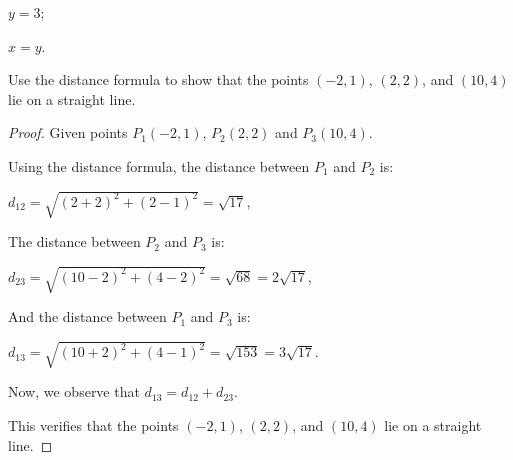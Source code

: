 \begin{questions}
\begin{tasks}
    \task $y=3$;
    \begin{solution}

    \end{solution}

    \task $x=y$.
    \begin{solution}

    \end{solution}
  \end{tasks}

  \item Use the distance formula to show that the points $(-2, 1)$, $(2,2)$, and $(10, 4)$ lie on a straight line.
  \begin{proof}
    Given points $P_1(-2, 1)$, $P_2(2,2)$ and $P_3(10,4)$.

    Using the distance formula, the distance between $P_1$ and $P_2$ is:

    $d_{12} = \sqrt{(2+2)^2+(2-1)^2}=\sqrt{17}$,

    The distance between $P_2$ and $P_3$ is:

    $d_{23} = \sqrt{(10-2)^2+(4-2)^2}=\sqrt{68}=2\sqrt{17}$,

    And the distance between $P_1$ and $P_3$ is:

    $d_{13} = \sqrt{(10+2)^2+(4-1)^2}=\sqrt{153}=3\sqrt{17}$.

    Now, we observe that $d_{13} = d_{12}+d_{23}$.

    This verifies that the points $(-2, 1)$, $(2,2)$, and $(10, 4)$ lie on a straight line.
  \end{proof}
\end{questions}